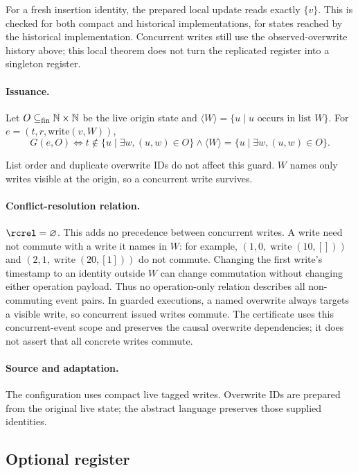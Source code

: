 For a fresh insertion identity, the prepared local update reads exactly $\{v\}$. This is checked for both compact and historical implementations, for states reached by the historical implementation. Concurrent writes still use the observed-overwrite history above; this local theorem does not turn the replicated register into a singleton register.


\paragraph{Issuance.}
Let $O\subseteq_{\rm fin}\mathbb N\times\mathbb N$ be the live origin state and $\langle W\rangle=\{u\mid u\text{ occurs in list }W\}$. For $e=(t,r,\mathrm{write}(v,W))$,
\[
G(e,O)\iff t\notin\{u\mid\exists w,(u,w)\in O\}\land\langle W\rangle=\{u\mid\exists w,(u,w)\in O\}.
\]

List order and duplicate overwrite IDs do not affect this guard. $W$ names only writes visible at the origin, so a concurrent write survives.


\paragraph{Conflict-resolution relation.}
$\rcrel=\varnothing$. This adds no precedence between concurrent writes.
A write need not commute with a write it names in $W$: for example,
$(1,0,\operatorname{write}(10,[]))$ and
$(2,1,\operatorname{write}(20,[1]))$ do not commute. Changing the first
write's timestamp to an identity outside $W$ can change commutation without
changing either operation payload. Thus no operation-only relation describes
all non-commuting event pairs. In guarded executions, a named overwrite
always targets a visible write, so concurrent issued writes commute. The
certificate uses this concurrent-event scope and preserves the causal
overwrite dependencies; it does not assert that all concrete writes commute.


\paragraph{Source and adaptation.}
The configuration uses compact live tagged writes. Overwrite IDs are prepared from the original live state; the abstract language preserves those supplied identities.


\subsection{Optional register}
\label{app:dt-optional-register}

